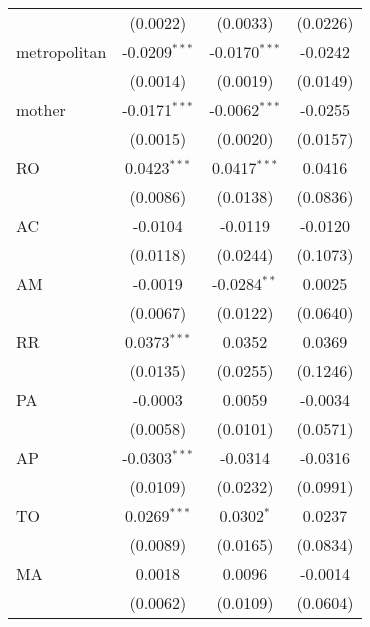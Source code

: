 \begin{tabular}{lccc}
                   & (0.0022)                & (0.0033)                & (0.0226)\\   
   metropolitan    & -0.0209$^{***}$         & -0.0170$^{***}$         & -0.0242\\   
                   & (0.0014)                & (0.0019)                & (0.0149)\\   
   mother          & -0.0171$^{***}$         & -0.0062$^{***}$         & -0.0255\\   
                   & (0.0015)                & (0.0020)                & (0.0157)\\   
   RO              & 0.0423$^{***}$          & 0.0417$^{***}$          & 0.0416\\   
                   & (0.0086)                & (0.0138)                & (0.0836)\\   
   AC              & -0.0104                 & -0.0119                 & -0.0120\\   
                   & (0.0118)                & (0.0244)                & (0.1073)\\   
   AM              & -0.0019                 & -0.0284$^{**}$          & 0.0025\\   
                   & (0.0067)                & (0.0122)                & (0.0640)\\   
   RR              & 0.0373$^{***}$          & 0.0352                  & 0.0369\\   
                   & (0.0135)                & (0.0255)                & (0.1246)\\   
   PA              & -0.0003                 & 0.0059                  & -0.0034\\   
                   & (0.0058)                & (0.0101)                & (0.0571)\\   
   AP              & -0.0303$^{***}$         & -0.0314                 & -0.0316\\   
                   & (0.0109)                & (0.0232)                & (0.0991)\\   
   TO              & 0.0269$^{***}$          & 0.0302$^{*}$            & 0.0237\\   
                   & (0.0089)                & (0.0165)                & (0.0834)\\   
   MA              & 0.0018                  & 0.0096                  & -0.0014\\   
                   & (0.0062)                & (0.0109)                & (0.0604)\\   

\end{tabular}
